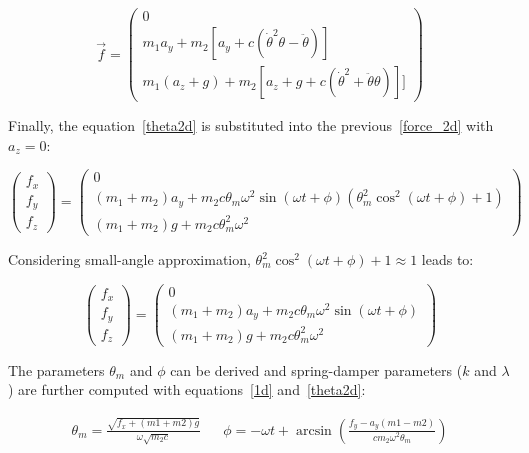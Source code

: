 \documentclass[a4paper, 11pt]{article}
\begin{document}
\begin{equation}
  \label{force_2d}
  \overrightarrow{f}
  =
  \begin{pmatrix}
  0 \\
  m_1 a_y + m_2 [a_y + c (\dot{\theta}^2 \theta - \ddot{\theta})] \\
  m_1 (a_z + g) + m_2 [a_z + g + c (\dot{\theta}^2 + \ddot{\theta} \theta)]]
  \end{pmatrix}
\end{equation}

Finally, the equation~\eqref{theta2d} is substituted into the previous~\eqref{force_2d} with $a_z = 0$:

\begin{equation*}
  \begin{pmatrix}
  f_x \\
  f_y \\
  f_z
  \end{pmatrix}
  =
  \begin{pmatrix}
  0 \\
  (m_1 + m_2) a_y + m_2 c \theta_m \omega^2 \sin(\omega t + \phi) (\theta_m^2 \cos^2(\omega t + \phi) + 1)  \\
  (m_1 + m_2) g + m_2 c \theta_m^2 \omega^2
  \end{pmatrix}
\end{equation*}

Considering small-angle  approximation, $\theta_m^2 \cos^2(\omega t + \phi) + 1 \approx 1$ leads to:

\begin{equation}
  \begin{pmatrix}
  f_x \\
  f_y \\
  f_z
  \end{pmatrix}
  =
  \begin{pmatrix}
  0 \\
  (m_1 + m_2) a_y + m_2 c \theta_m \omega^2 \sin(\omega t + \phi) \\
  (m_1 + m_2) g + m_2 c \theta_m^2 \omega^2
  \end{pmatrix}
\end{equation}



The parameters $\theta_m$ and $\phi$ can be derived and spring-damper parameters ($k$ and $\lambda$) are further computed with equations~\eqref{1d} and~\eqref{theta2d}:

\begin{align}
  \theta_m = \frac{\sqrt{f_x + (m1 + m2) g}}{ \omega \sqrt{m_2 c}} &&
  \phi = - \omega t + \arcsin \left( \frac{f_y - a_y (m1 - m2)}{c m_2 \omega^2 \theta_m} \right)
\end{align}
\end{document}
